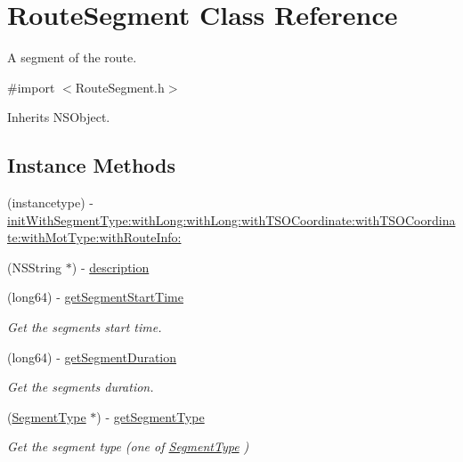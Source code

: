 \hypertarget{interface_route_segment}{}\section{Route\+Segment Class Reference}
\label{interface_route_segment}


A segment of the route.  




{\ttfamily \#import $<$Route\+Segment.\+h$>$}



Inherits N\+S\+Object.

\subsection*{Instance Methods}
\begin{DoxyCompactItemize}
\item 
(instancetype) -\/ \hyperlink{interface_route_segment_a84b9de1dccdb9cd9511b43e5e836cd3d}{init\+With\+Segment\+Type\+:with\+Long\+:with\+Long\+:with\+T\+S\+O\+Coordinate\+:with\+T\+S\+O\+Coordinate\+:with\+Mot\+Type\+:with\+Route\+Info\+:}
\item 
(N\+S\+String $\ast$) -\/ \hyperlink{interface_route_segment_a4f031379fff20fa3b9239d39488e85c4}{description}
\item 
(long64) -\/ \hyperlink{interface_route_segment_a8ee73964122deb0a917c40f3bb4bf77e}{get\+Segment\+Start\+Time}
\begin{DoxyCompactList}\small\item\em Get the segment\textquotesingle{}s start time. \end{DoxyCompactList}\item 
(long64) -\/ \hyperlink{interface_route_segment_a0b857f7a2db2508eed43fc223d9c368e}{get\+Segment\+Duration}
\begin{DoxyCompactList}\small\item\em Get the segment\textquotesingle{}s duration. \end{DoxyCompactList}\item 
(\hyperlink{interface_segment_type}{Segment\+Type} $\ast$) -\/ \hyperlink{interface_route_segment_ab91ff54a454d8516259529c01b749004}{get\+Segment\+Type}
\begin{DoxyCompactList}\small\item\em Get the segment type (one of \hyperlink{interface_segment_type}{Segment\+Type} ) \end{DoxyCompactList}\item 

\end{DoxyCompactItemize}
